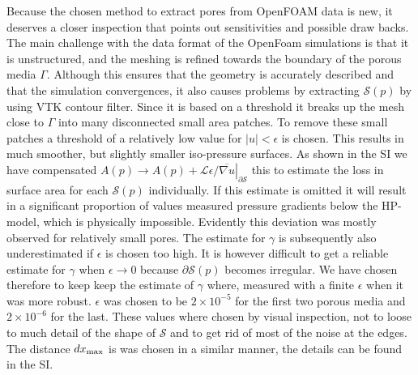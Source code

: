 \documentclass[draft]{agujournal2019}
\begin{document}
Because the chosen method to extract pores from OpenFOAM data is new, it deserves a closer inspection that points out sensitivities and possible draw backs. 
The main challenge with the data format of the OpenFoam simulations is that it is unstructured, and the meshing is refined towards the boundary of the porous media $\Gamma$. Although this ensures that the geometry is accurately described and that the simulation convergences, it also causes problems by extracting $\mathcal{S}(p)$ by using VTK contour filter. Since it is based on a threshold it breaks up the mesh close to $\Gamma$ into many disconnected small area patches. To remove these small patches a threshold of a relatively low value for $\left|u\right|< \epsilon$ is chosen. This results in much smoother, but slightly smaller iso-pressure surfaces. As shown in the SI we have compensated $A(p)\rightarrow A(p) + \left.\mathcal{L}\epsilon/\overline{\nabla u}\right|_{\partial \mathcal{S}}$ this to estimate the loss in surface area for each $\mathcal{S}(p)$ individually. If this estimate is omitted it will result in a significant proportion of values measured pressure gradients below the HP-model, which is physically impossible. Evidently this deviation was mostly observed for relatively small pores. 
The estimate for $\gamma$ is subsequently also underestimated if $\epsilon$ is chosen too high. It is however difficult to get a reliable estimate for $\gamma$ when $\epsilon \rightarrow 0$ because $\partial \mathcal{S}(p)$ becomes irregular. We have chosen therefore to keep keep the estimate of $\gamma$ where, measured with a finite $\epsilon$ when it was more robust. $\epsilon$ was chosen to be $2\times10^{-5}$ for the first two porous media and $2\times10^{-6}$ for the last. These values where chosen by visual inspection, not to loose to much detail of the shape of $\mathcal{S}$ and to get rid of most of the noise at the edges. The distance $dx_{\rm{max}}$ is was chosen in a similar manner, the details can be found in the SI. 
\end{document}
